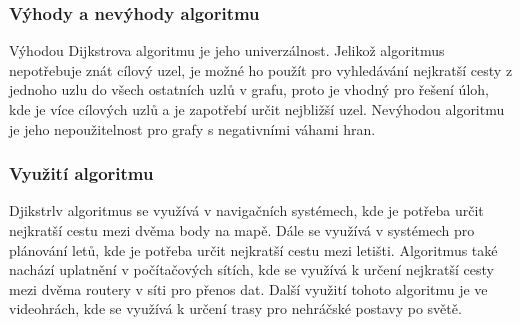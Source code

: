 \documentclass[12pt, titlepage, a4paper]{article}
\begin{document}
\subsubsection{Výhody a nevýhody algoritmu}
Výhodou Dijkstrova algoritmu je jeho univerzálnost. Jelikož algoritmus nepotřebuje znát 
cílový uzel, je možné ho použít pro vyhledávání nejkratší cesty z jednoho uzlu do všech 
ostatních uzlů v grafu, proto je vhodný pro řešení úloh, kde je více cílových uzlů a je 
zapotřebí určit nejbližší uzel. Nevýhodou algoritmu je jeho nepoužitelnost pro grafy s 
negativními váhami hran.

\subsubsection{Využití algoritmu}
Djikstrlv algoritmus se využívá v navigačních systémech, kde je potřeba určit nejkratší cestu 
mezi dvěma body na mapě. Dále se využívá v systémech pro plánování letů, kde je potřeba určit 
nejkratší cestu mezi letišti. Algoritmus také nachází uplatnění v počítačových sítích, kde se 
využívá k určení nejkratší cesty mezi dvěma routery v síti pro přenos dat. Další využití 
tohoto algoritmu je ve videohrách, kde se využívá k určení trasy pro nehráčské postavy po světě.
\end{document}
